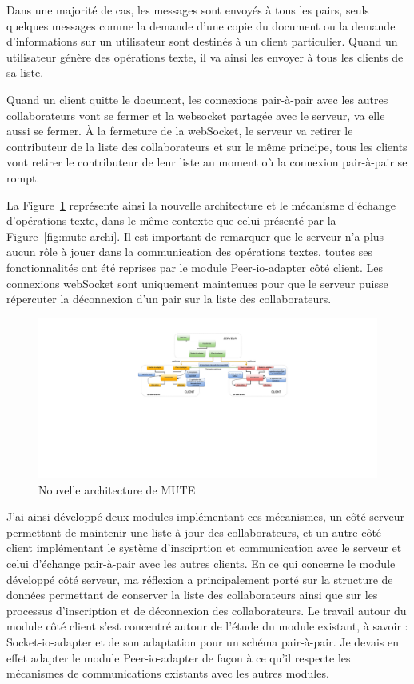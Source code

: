 \documentclass{tnreport}
\begin{document}
Dans une majorité de cas, les messages sont envoyés à tous les pairs, seuls quelques messages comme la demande d'une copie du document ou la demande d'informations sur un utilisateur sont destinés à un client particulier. Quand un utilisateur génère des opérations texte, il va ainsi les envoyer à tous les clients de sa liste.

Quand un client quitte le document, les connexions pair-à-pair avec les autres collaborateurs vont se fermer et la websocket partagée avec le serveur, va elle aussi se fermer. À la fermeture de la webSocket, le serveur va retirer le contributeur de la liste des collaborateurs et sur le même principe, tous les clients vont retirer le contributeur de leur liste au moment où la connexion pair-à-pair se rompt. 

La Figure~\ref{fig:mute-archi-p2p} représente ainsi la nouvelle architecture et le mécanisme d'échange d'opérations texte, dans le même contexte que celui présenté par la Figure~\ref{fig:mute-archi}. Il est important de remarquer que le serveur n'a plus aucun rôle à jouer dans la communication des opérations textes, toutes ses fonctionnalités ont été reprises par le module Peer-io-adapter côté client. Les connexions webSocket sont uniquement maintenues pour que le serveur puisse répercuter la déconnexion d'un pair sur la liste des collaborateurs.

\begin{figure}[!h]
  \centering
  \includegraphics[width=17cm]{figures/MUTE-archi-p2p}
  \caption{Nouvelle architecture de MUTE}
  \label{fig:mute-archi-p2p}
\end{figure}

J'ai ainsi développé deux modules implémentant ces mécanismes, un côté serveur permettant de maintenir une liste à jour des collaborateurs, et un autre côté client implémentant le système d'insciprtion et communication avec le serveur et celui d'échange pair-à-pair avec les autres clients. En ce qui concerne le module développé côté serveur, ma réflexion a principalement porté sur la structure de données permettant de conserver la liste des collaborateurs ainsi que sur les processus d'inscription et de déconnexion des collaborateurs. Le travail autour du module côté client s'est concentré autour de l'étude du module existant, à savoir : Socket-io-adapter et de son adaptation pour un schéma pair-à-pair. Je devais en effet adapter le module Peer-io-adapter de façon à ce qu'il respecte les mécanismes de communications existants avec les autres modules.
\end{document}

